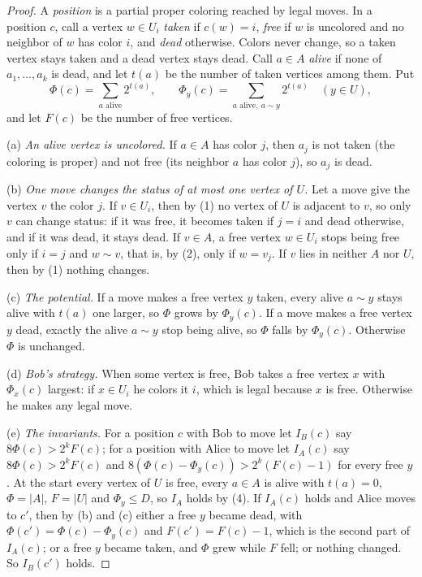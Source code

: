 \documentclass[11pt]{article}
\theoremstyle{remark}
\begin{document}
\begin{proof}
A \emph{position} is a partial proper coloring reached by legal moves.
In a position $c$, call a vertex $w\in U_i$ \emph{taken} if $c(w)=i$,
\emph{free} if $w$ is uncolored and no neighbor of $w$ has color $i$, and
\emph{dead} otherwise. Colors never change, so a taken vertex stays taken
and a dead vertex stays dead. Call $a\in A$ \emph{alive} if none of
$a_1,\dots,a_k$ is dead, and let $t(a)$ be the number of taken vertices
among them. Put
\[
\Phi(c)=\sum_{a\text{ alive}}2^{t(a)},\qquad
\Phi_y(c)=\sum_{a\text{ alive},\ a\sim y}2^{t(a)}\quad(y\in U),
\]
and let $F(c)$ be the number of free vertices.

(a) \emph{An alive vertex is uncolored.} If $a\in A$ has color $j$, then
$a_j$ is not taken (the coloring is proper) and not free (its neighbor $a$
has color $j$), so $a_j$ is dead.

(b) \emph{One move changes the status of at most one vertex of $U$.} Let a
move give the vertex $v$ the color $j$. If $v\in U_i$, then by (1) no
vertex of $U$ is adjacent to $v$, so only $v$ can change status: if it
was free, it becomes taken if $j=i$ and dead otherwise, and if it was dead,
it stays dead. If $v\in A$, a free vertex $w\in U_i$ stops being
free only if $i=j$ and $w\sim v$, that is, by (2), only if $w=v_j$. If $v$
lies in neither $A$ nor $U$, then by (1) nothing changes.

(c) \emph{The potential.} If a move makes a free vertex $y$ taken, every
alive $a\sim y$ stays alive with $t(a)$ one larger, so $\Phi$ grows by
$\Phi_y(c)$. If a move makes a free vertex $y$ dead, exactly the alive
$a\sim y$ stop being alive, so $\Phi$ falls by $\Phi_y(c)$. Otherwise
$\Phi$ is unchanged.

(d) \emph{Bob's strategy.} When some vertex is free, Bob takes a free
vertex $x$ with $\Phi_x(c)$ largest: if $x\in U_i$ he colors it $i$, which
is legal because $x$ is free. Otherwise he makes any legal move.

(e) \emph{The invariants.} For a position $c$ with Bob to move let
$I_B(c)$ say $8\Phi(c)>2^kF(c)$; for a position with Alice to move let
$I_A(c)$ say $8\Phi(c)>2^kF(c)$ and
$8(\Phi(c)-\Phi_y(c))>2^k(F(c)-1)$ for every free $y$.
At the start every vertex of $U$ is free, every $a\in A$ is alive with
$t(a)=0$, $\Phi=|A|$, $F=|U|$ and $\Phi_y\le D$, so $I_A$ holds by (4).
If $I_A(c)$ holds and Alice moves to $c'$, then by (b) and (c) either a
free $y$ became dead, with $\Phi(c')=\Phi(c)-\Phi_y(c)$ and
$F(c')=F(c)-1$, which is the second part of $I_A(c)$; or a free $y$ became
taken, and $\Phi$ grew while $F$ fell; or nothing changed. So $I_B(c')$
holds.


\end{proof}
\end{document}
